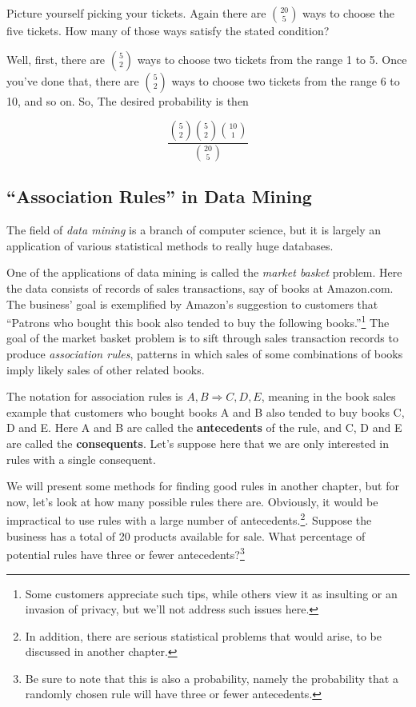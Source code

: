 Picture yourself picking your tickets.  Again there are $\binom{20}{5}$
ways to choose the five tickets.  How many of those ways satisfy the
stated condition?

Well, first, there are $\binom{5}{2}$ ways to choose two tickets from
the range 1 to 5.  Once you've done that, there are $\binom{5}{2}$ ways
to choose two tickets from the range 6 to 10, and so on.  So, The
desired probability is then

\begin{equation}
\frac
{\binom{5}{2} \binom{5}{2} \binom{10}{1}} 
{\binom{20}{5}}
\end{equation}

\subsection{``Association Rules'' in Data Mining}
\label{assocrules}

The field of {\it data mining} is a branch of computer science, but it
is largely an application of various statistical methods to really huge
databases.

One of the applications of data mining is called the {\it market basket}
problem.  Here the data consists of records of sales transactions, say
of books at Amazon.com.  The business' goal is exemplified by Amazon's
suggestion to customers that ``Patrons who bought this book also tended
to buy the following books.''\footnote{Some customers appreciate such tips,
while others view it as insulting or an invasion of privacy, but we'll
not address such issues here.}  The goal of the market basket problem is
to sift through sales transaction records to produce {\it association
rules}, patterns in which sales of some combinations of books imply
likely sales of other related books.

The notation for association rules is $A,B \Rightarrow C,D,E$, meaning
in the book sales example that customers who bought books A and B also
tended to buy books C, D and E.  Here A and B are called the {\bf
antecedents} of the rule, and C, D and E are called the {\bf
consequents}.  Let's suppose here that we are only interested in rules
with a single consequent.  

We will present some methods for finding good rules in another chapter, but
for now, let's look at how many possible rules there are.  Obviously, it
would be impractical to use rules with a large number of
antecedents.\footnote{In addition, there are serious statistical
problems that would arise, to be discussed in another chapter.}.  Suppose
the business has a total of 20 products available for sale.  What
percentage of potential rules have three or fewer
antecedents?\footnote{Be sure to note that this is also a probability,
namely the probability that a randomly chosen rule will have three or
fewer antecedents.}


